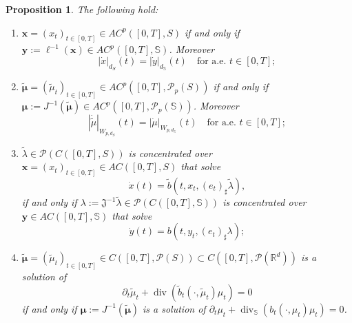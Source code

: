 \documentclass[10pt,leqno]{amsart}
\numberwithin{equation}{section}
\newtheorem{prop}[teorema]{Proposition}
\newcommand{\R}{\mathbb{R}}
\newcommand{\PP}{\mathcal{P}}
\newcommand{\Ss}{\mathbb{S}}
\begin{document}
\begin{prop}\label{prop: correspondence}
    The following hold:
    \begin{enumerate}
        \item $\boldsymbol{x} = (x_t)_{t\in[0,T]} \in AC^p([0,T],S)$ if and only if $\boldsymbol{y}:= \ell^{-1}(\boldsymbol{x}) \in AC^p([0,T],\Ss)$. Moreover
        \begin{equation}\label{eq: ac curves corr}
            |\dot{x}|_{d_S}(t) = |\dot{y}|_{d_\Ss}(t) \quad \text{for a.e. }t\in[0,T];
        \end{equation}
        \item $\boldsymbol{\tilde\mu} = (\tilde\mu_t)_{t\in[0,T]} \in AC^p([0,T],\PP_p(S))$ if and only if $\boldsymbol{\mu}:= J^{-1}(\boldsymbol{\tilde\mu}) \in AC^p([0,T],\PP_p(\Ss))$. Moreover
        \begin{equation}\label{eq: ac curves meas corr}
            |\dot{\tilde{\mu}}|_{W_{p,d_S}}(t) = |\dot{\mu}|_{W_{p,d_\Ss}}(t) \quad \text{for a.e. }t\in[0,T];
        \end{equation}
        \item $\tilde{\lambda} \in \PP(C([0,T],S))$ is concentrated over $\boldsymbol{x} = (x_t)_{t\in[0,T]} \in AC([0,T],S)$ that solve
        \begin{equation}\label{ode x}
            \dot{x}(t) = \tilde{b}(t,x_t,(e_t)_\sharp\tilde\lambda),
        \end{equation} 
        if and only if $\lambda := \mathfrak{J}^{-1} \tilde\lambda \in \PP(C([0,T],\Ss))$ is concentrated over $\boldsymbol{y}\in AC([0,T],\Ss)$ that solve
        \begin{equation}\label{ode y}
            \dot{y}(t) = b(t,y_t,(e_t)_\sharp\lambda);
        \end{equation}
        \item $\boldsymbol{\tilde\mu} = (\tilde\mu_t)_{t\in[0,T]} \in C([0,T],\PP(S)) \subset C([0,T],\PP(\R^d))$ is a solution of 
        \begin{equation}\label{eq: ce tilde}
            \partial_t\tilde\mu_t + \operatorname{div}(\tilde{b}_t(\cdot,\tilde{\mu}_t)\mu_t) = 0
        \end{equation} 
        if and only if $\boldsymbol{\mu}:= J^{-1}(\boldsymbol{\tilde\mu})$ is a solution of $\partial_t\mu_t + \operatorname{div}_{\Ss}(b_t(\cdot,\mu_t)\mu_t) = 0$.
    \end{enumerate}
\end{prop}
\end{document}
